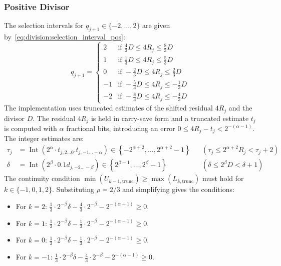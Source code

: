\documentclass{article}
\DeclareMathOperator{\Int}{Int}
\begin{document}
\subsubsection{Positive Divisor}
\label{sssec:division:radix4_pos}
The selection intervals for $q_{j+1} \in \{-2, \dots, 2\}$ are given by~\cref{eq:division:selection_interval_pos}:
\begin{equation}
  \label{eq:division:radix4_intervals_pos}
  q_{j+1} =
  \begin{cases}
    2  & \text{if } \frac{4}{3} D \leq 4 R_j \leq \frac{8}{3} D \\
    1  & \text{if } \frac{1}{3} D \leq 4 R_j \leq \frac{5}{3} D \\
    0  & \text{if } -\frac{2}{3} D \leq 4 R_j \leq \frac{2}{3} D \\
    -1 & \text{if } -\frac{5}{3} D \leq 4 R_j \leq -\frac{1}{3} D \\
    -2 & \text{if } -\frac{8}{3} D \leq 4 R_j \leq -\frac{4}{3} D
  \end{cases}
\end{equation}
The implementation uses truncated estimates of the shifted residual $4R_j$ and the divisor $D$.
The residual $4R_j$ is held in carry-save form and a truncated estimate $t_j$ is computed with $\alpha$ fractional bits, introducing an error $0 \leq 4 R_j - t_j < 2^{-(\alpha-1)}$.
The integer estimates are:
\begin{align}
  \label{eq:division:radix4_tau_def}
  \tau_j &= \Int(2^\alpha \cdot t_{j,2\ldots0}.t_{j,-1\ldots-\alpha}) \in \left\{-2^{\alpha+2}, \dots, 2^{\alpha+2}-1\right\} && (\tau_j \leq 2^{\alpha+2} R_j < \tau_j + 2) \\
  \label{eq:division:radix4_delta_def}
  \delta &= \Int(2^\beta \cdot 0.1d_{j,-2\ldots-\beta}) \in \left\{2^{\beta-1}, \dots, 2^\beta-1\right\} && (\delta \leq 2^\beta D < \delta + 1)
\end{align}
The continuity condition $\min(U_{k-1,\mathrm{trunc}}) \geq \max(L_{k,\mathrm{trunc}})$ must hold for $k \in \{-1, 0, 1, 2\}$.
Substituting $\rho = 2/3$ and simplifying gives the conditions:
\begin{itemize}
  \item For $k = 2$: $\frac{1}{3} \cdot 2^{-\beta} \delta - \frac{4}{3} \cdot 2^{-\beta} - 2^{-(\alpha-1)} \geq 0$.
  \item For $k = 1$: $\frac{1}{3} \cdot 2^{-\beta} \delta - \frac{1}{3} \cdot 2^{-\beta} - 2^{-(\alpha-1)} \geq 0$.
  \item For $k = 0$: $\frac{1}{3} \cdot 2^{-\beta} \delta - \frac{1}{3} \cdot 2^{-\beta} - 2^{-(\alpha-1)} \geq 0$.
  \item For $k = -1$: $\frac{1}{3} \cdot 2^{-\beta} \delta - \frac{4}{3} \cdot 2^{-\beta} - 2^{-(\alpha-1)} \geq 0$.
\end{itemize}
\end{document}
